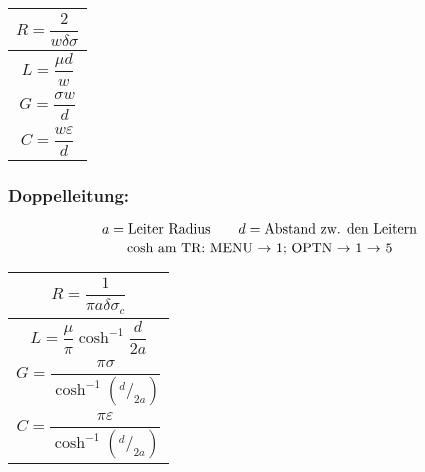 
{\renewcommand*{\arraystretch}{0.2}
	\begin{tabularx}{0.5\columnwidth}{|X|}
		\hline
		\[R=\frac{2}{w\delta\sigma}\] \\
		\hline
		\[L=\frac{\mu d}{w}\]         \\
		\hline
		\[G=\frac{\sigma w}{d}\]      \\
		\hline
		\[C=\frac{w\varepsilon}{d}\]  \\
		\hline
	\end{tabularx}
}

\subsubsection{Doppelleitung:}
{\small\[
	a = \text{Leiter Radius} \qquad d = \text{Abstand zw. den Leitern}\\
	\]}
{\small\[
	\text{cosh am TR: MENU $\rightarrow$ 1; OPTN $\rightarrow$ 1 $\rightarrow$ 5}\\
	\]}

{\renewcommand*{\arraystretch}{0.2}
	\begin{tabularx}{0.5\columnwidth}{|X|}
		\hline
		\[R  = \frac{1}{\pi a\delta\sigma_c}\]              \\
		\hline
		\[L = \frac{\mu}{\pi} \cosh^{-1}\frac{d}{2a}\]      \\
		\hline
		\[G = \frac{\pi\sigma}{\cosh^{-1}(^d/_{2a})}\]      \\
		\hline
		\[C = \frac{\pi\varepsilon}{\cosh^{-1}(^d/_{2a})}\] \\
		\hline
\end{tabularx}}

